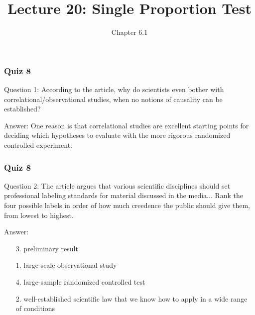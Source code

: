 \documentclass[slides]{beamer}
\title{Lecture 20: Single Proportion Test}
\author{Chapter 6.1}
\date{}
\newcommand{\blue}[1]{\textcolor{blue2}{#1}}
\begin{document}
\begin{frame}
\titlepage
\end{frame}


\begin{frame}[fragile]
\frametitle{Quiz 8}

\blue{Question 1}: According to the article, why do scientists even bother with correlational/observational studies, when no notions of causality can be established?

\vspace{0.5cm}

\pause\blue{Answer}:  One reason is that correlational studies are excellent starting points for deciding which hypotheses to evaluate with the more rigorous randomized controlled experiment.

\end{frame}


\begin{frame}[fragile]
\frametitle{Quiz 8}

\blue{Question 2}: The article argues that various scientific disciplines should set professional labeling standards for material discussed in the media...  Rank the four possible labels in order of how much creedence the public should give them, from lowest to highest.  

\vspace{0.5cm}

\pause\blue{Answer}:
\begin{enumerate}
\item[3.] preliminary result
\item[1.] large-scale observational study
\item[4.] large-sample randomized controlled test
\item[2.] well-established scientific law that we know how to apply in a wide range of conditions
\end{enumerate}

\end{frame}
\end{document}
